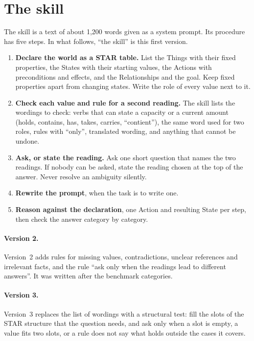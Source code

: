 \documentclass[11pt,a4paper]{article}
\begin{document}
\section{The skill}
\label{sec:skill}

The skill is a text of about 1,200 words given as a system prompt. Its
procedure has five steps. In what follows, ``the skill'' is this first
version.

\begin{enumerate}\setlength\itemsep{2pt}
\item \textbf{Declare the world as a STAR table.} List the Things with
their fixed properties, the States with their starting values, the Actions
with preconditions and effects, and the Relationships and the goal. Keep
fixed properties apart from changing states. Write the role of every value
next to it.
\item \textbf{Check each value and rule for a second reading.} The skill
lists the wordings to check: verbs that can state a capacity or a current
amount (holds, contains, has, takes, carries, ``contient''), the same word
used for two roles, rules with ``only'', translated wording, and anything
that cannot be undone.
\item \textbf{Ask, or state the reading.} Ask one short question that
names the two readings. If nobody can be asked, state the reading chosen
at the top of the answer. Never resolve an ambiguity silently.
\item \textbf{Rewrite the prompt}, when the task is to write one.
\item \textbf{Reason against the declaration}, one Action and resulting
State per step, then check the answer category by category.
\end{enumerate}

\paragraph{Version 2.} Version~2 adds rules for missing values,
contradictions, unclear references and irrelevant facts, and the rule
``ask only when the readings lead to different answers''. It was written
after the benchmark categories.

\paragraph{Version 3.} Version~3 replaces the list of wordings with a
structural test: fill the slots of the STAR structure that the question
needs, and ask only when a slot is empty, a value fits two slots, or a
rule does not say what holds outside the cases it covers.
\end{document}

